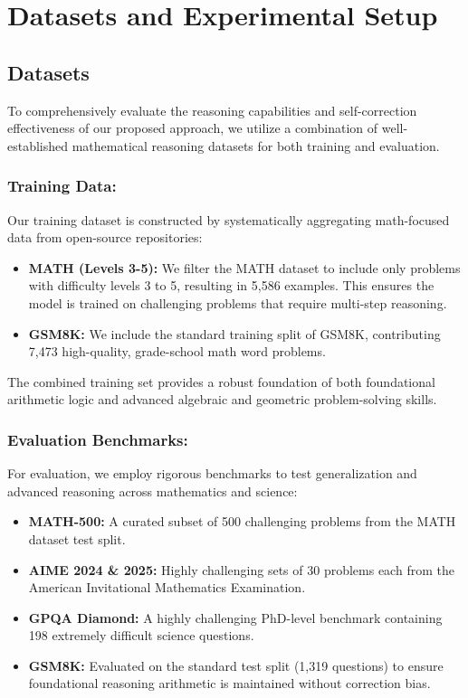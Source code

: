 \section{Datasets and Experimental Setup}

\subsection{Datasets}
To comprehensively evaluate the reasoning capabilities and self-correction effectiveness of our proposed approach, we utilize a combination of well-established mathematical reasoning datasets for both training and evaluation.

\subsubsection{Training Data:}
Our training dataset is constructed by systematically aggregating math-focused data from open-source repositories:
\begin{itemize}
    \item \textbf{MATH (Levels 3-5):} We filter the MATH dataset to include only problems with difficulty levels 3 to 5, resulting in 5,586 examples. This ensures the model is trained on challenging problems that require multi-step reasoning.
    \item \textbf{GSM8K:} We include the standard training split of GSM8K, contributing 7,473 high-quality, grade-school math word problems.
\end{itemize}
The combined training set provides a robust foundation of both foundational arithmetic logic and advanced algebraic and geometric problem-solving skills.

\subsubsection{Evaluation Benchmarks:}
For evaluation, we employ rigorous benchmarks to test generalization and advanced reasoning across mathematics and science:
\begin{itemize}
    \item \textbf{MATH-500:} A curated subset of 500 challenging problems from the MATH dataset test split.
    \item \textbf{AIME 2024 \& 2025:} Highly challenging sets of 30 problems each from the American Invitational Mathematics Examination.
    \item \textbf{GPQA Diamond:} A highly challenging PhD-level benchmark containing 198 extremely difficult science questions.
    \item \textbf{GSM8K:} Evaluated on the standard test split (1,319 questions) to ensure foundational reasoning arithmetic is maintained without correction bias.
\end{itemize}

